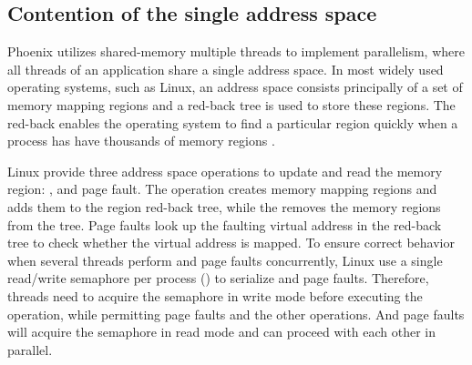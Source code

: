 




\subsection{Contention of the single address space}
Phoenix utilizes shared-memory multiple threads to implement parallelism, where all threads of an application share a single address space.
In most widely used operating systems, such as Linux, an address space consists principally of a set of memory mapping regions and a red-back tree is used to store these regions. 
The red-back enables the operating system to find a particular region quickly when a process has have thousands of memory regions \cite{linux}.

Linux provide three address space operations to update and read the memory region: ,  and page fault.
The  operation creates memory mapping regions and adds them to the region red-back tree, while the  removes the memory regions from the tree.
Page faults look up the faulting virtual address in the red-back tree to check whether the virtual address is mapped.
To ensure correct behavior when several threads perform  and page faults concurrently, Linux use a single read/write semaphore per process () to serialize  and page faults.
Therefore, threads need to acquire the semaphore in write mode before executing the  operation, while permitting page faults and the other  operations.
And page faults will acquire the semaphore in read mode and can proceed with each other in parallel. 

